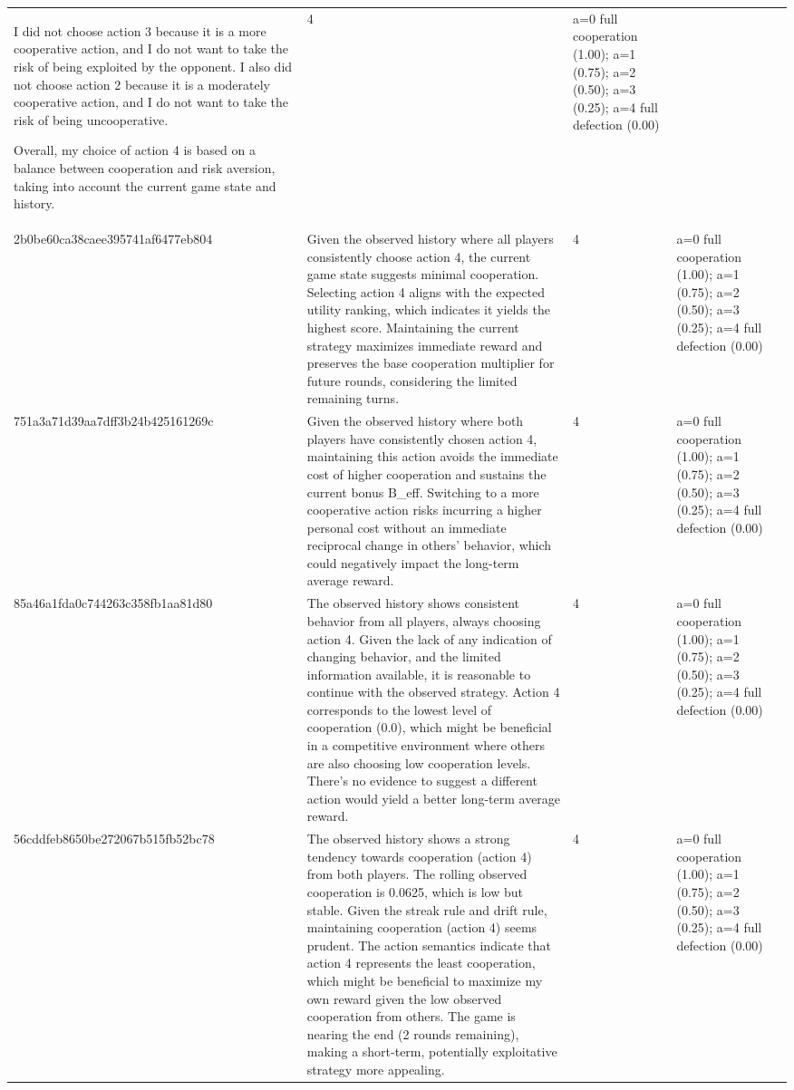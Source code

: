 \begin{tabular}{lp{8cm}ll l}
I did not choose action 3 because it is a more cooperative action, and I do not want to take the risk of being exploited by the opponent. I also did not choose action 2 because it is a moderately cooperative action, and I do not want to take the risk of being uncooperative.

Overall, my choice of action 4 is based on a balance between cooperation and risk aversion, taking into account the current game state and history. & 4 & a=0 full cooperation (1.00); a=1 (0.75); a=2 (0.50); a=3 (0.25); a=4 full defection (0.00) &  \\
2b0be60ca38caee395741af6477eb804 & Given the observed history where all players consistently choose action 4, the current game state suggests minimal cooperation. Selecting action 4 aligns with the expected utility ranking, which indicates it yields the highest score. Maintaining the current strategy maximizes immediate reward and preserves the base cooperation multiplier for future rounds, considering the limited remaining turns. & 4 & a=0 full cooperation (1.00); a=1 (0.75); a=2 (0.50); a=3 (0.25); a=4 full defection (0.00) &  \\
751a3a71d39aa7dff3b24b425161269c & Given the observed history where both players have consistently chosen action 4, maintaining this action avoids the immediate cost of higher cooperation and sustains the current bonus B\_eff. Switching to a more cooperative action risks incurring a higher personal cost without an immediate reciprocal change in others' behavior, which could negatively impact the long-term average reward. & 4 & a=0 full cooperation (1.00); a=1 (0.75); a=2 (0.50); a=3 (0.25); a=4 full defection (0.00) &  \\
85a46a1fda0c744263c358fb1aa81d80 & The observed history shows consistent behavior from all players, always choosing action 4. Given the lack of any indication of changing behavior, and the limited information available, it is reasonable to continue with the observed strategy. Action 4 corresponds to the lowest level of cooperation (0.0), which might be beneficial in a competitive environment where others are also choosing low cooperation levels. There's no evidence to suggest a different action would yield a better long-term average reward. & 4 & a=0 full cooperation (1.00); a=1 (0.75); a=2 (0.50); a=3 (0.25); a=4 full defection (0.00) &  \\
56cddfeb8650be272067b515fb52bc78 & The observed history shows a strong tendency towards cooperation (action 4) from both players. The rolling observed cooperation is 0.0625, which is low but stable. Given the streak rule and drift rule, maintaining cooperation (action 4) seems prudent. The action semantics indicate that action 4 represents the least cooperation, which might be beneficial to maximize my own reward given the low observed cooperation from others. The game is nearing the end (2 rounds remaining), making a short-term, potentially exploitative strategy more appealing. & 4 & a=0 full cooperation (1.00); a=1 (0.75); a=2 (0.50); a=3 (0.25); a=4 full defection (0.00) &  \\

\end{tabular}
